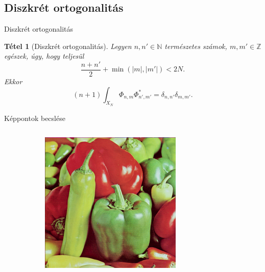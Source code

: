 \documentclass{beamer}
\newcommand{\N}{\mathbb{N}}
\newcommand{\Z}{\mathbb{Z}}
\def\N{{\mathbb N}}
\def\Z{{\mathbb Z}}
\newtheorem{tetel}{Tétel}
\begin{document}
\subsection{Diszkrét ortogonalitás}
\begin{frame}{Diszkrét ortogonalitás}
\begin{tetel}[Diszkrét ortogonalitás]
    Legyen $n, n' \in \N$ természetes számok, $m, m' \in \Z$ egészek, úgy, hogy teljesül $$\frac{n + n'}{2} + \min(|m|,|m'|) < 2N.$$
    Ekkor $$(n + 1)\int_{X_N}\Phi_{n,m}\Phi_{n',m'}^* = \delta_{n,n'}\delta_{m,m'}.$$
\end{tetel}
\end{frame}

\begin{frame}{Képpontok becslése}

\begin{columns}
    \begin{column}{0.5\textwidth}
        \begin{figure}
            \begin{subfigure}{.48\textwidth}
                \centering
            \includegraphics[width=\textwidth]{figures/pepper_color_256.png}
            \end{subfigure}
            \begin{subfigure}{.48\textwidth}
                \centering

\end{subfigure}
\end{figure}
\end{column}
\end{columns}
\end{frame}
\end{document}
